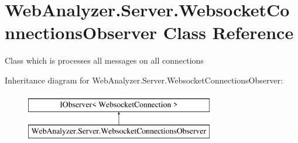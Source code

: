 \hypertarget{class_web_analyzer_1_1_server_1_1_websocket_connections_observer}{}\section{Web\+Analyzer.\+Server.\+Websocket\+Connections\+Observer Class Reference}
\label{class_web_analyzer_1_1_server_1_1_websocket_connections_observer}


Class which is processes all messages on all connections  


Inheritance diagram for Web\+Analyzer.\+Server.\+Websocket\+Connections\+Observer\+:\begin{figure}[H]
\begin{center}
\leavevmode
\includegraphics[height=2.000000cm]{class_web_analyzer_1_1_server_1_1_websocket_connections_observer}
\end{center}
\end{figure}
